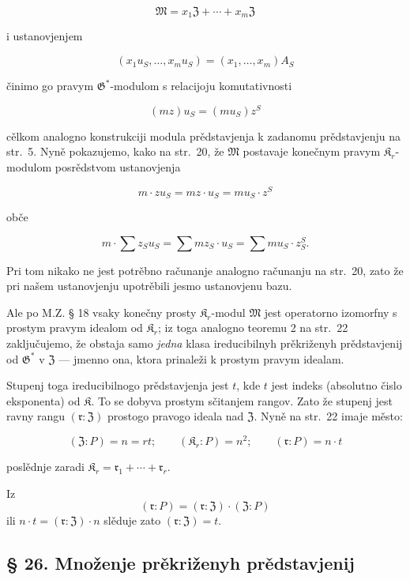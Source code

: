 \documentclass[11pt]{article}
\begin{document}
\[\mathfrak{M}=x_1\mathfrak{Z}+\cdots+x_m\mathfrak{Z}\]

i ustanovjenjem

\[(x_1u_S,\ldots,x_mu_S)=(x_1,\ldots,x_m)A_S\]

činimo go pravym \(\mathfrak G^*\)-modulom s relacijoju komutativnosti

\[(mz) u_S = (mu_S) z^S\]

cělkom analogno konstrukciji modula prědstavjenja k zadanomu prědstavjenju na str.~5. Nyně pokazujemo, kako na str.~20, že \(\mathfrak{M}\) postavaje konečnym pravym \(\mathfrak K_r\)-modulom posrědstvom ustanovjenja

\[m \cdot z u_S = mz \cdot u_S = mu_S \cdot z^S\]

obče

\[m \cdot \sum z_S u_S = \sum m z_S \cdot u_S = \sum m u_S \cdot z_S^S.\]

Pri tom nikako ne jest potrěbno računanje analogno računanju na str.~20, zato že pri našem ustanovjenju upotrěbili jesmo ustanovjenu bazu.

Ale po M.Z. § 18 vsaky konečny prosty \(\mathfrak K_r\)-modul \(\mathfrak{M}\) jest operatorno izomorfny s prostym pravym idealom od \(\mathfrak K_r\); iz toga analogno teoremu 2 na str.~22 zaključujemo, že obstaja samo \emph{jedna} klasa ireducibilnyh prěkriženyh prědstavjenij od \(\mathfrak{G}^*\) v \(\mathfrak Z\) --- jmenno ona, ktora prinaleži k prostym pravym idealam.

Stupenj toga ireducibilnogo prědstavjenja jest \(t\), kde \(t\) jest indeks (absolutno čislo eksponenta) od \(\mathfrak K\). To se dobyva prostym sčitanjem rangov. Zato že stupenj jest ravny rangu \((\mathfrak r:\mathfrak Z)\) prostogo pravogo ideala nad \(\mathfrak Z\). Nyně na str.~22 imaje město:

\[
(\mathfrak Z:P)=n=rt;\qquad (\mathfrak K_r:P)=n^2;\qquad (\mathfrak r:P)=n\cdot t
\]

poslědnje zaradi \(\mathfrak K_r = \mathfrak{r}_1 + \cdots + \mathfrak{r}_r\).

Iz
\[(\mathfrak{r}: P) = (\mathfrak{r}: \mathfrak Z) \cdot (\mathfrak Z: P)\]
ili \(n \cdot t = (\mathfrak{r}: \mathfrak Z) \cdot n\) slěduje zato \((\mathfrak{r}: \mathfrak Z) = t\).

\subsection*{§ 26. Množenje prěkriženyh prědstavjenij}\label{multiplikation-der-verschraenkten-darstellungen}
\end{document}
